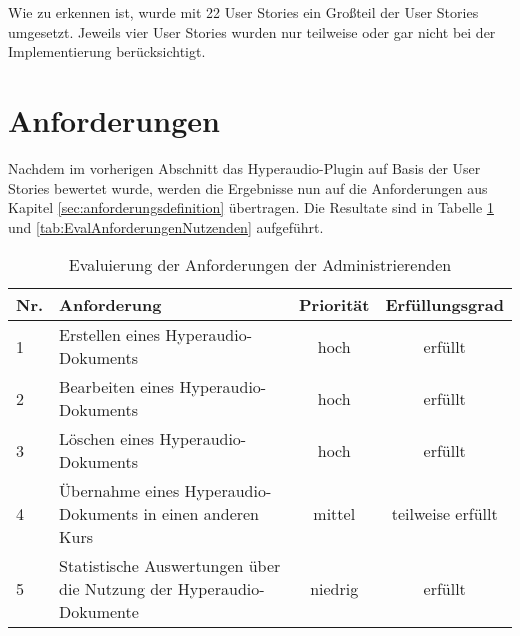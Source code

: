 Wie zu erkennen ist, wurde mit 22 User Stories ein Großteil der User Stories umgesetzt. Jeweils vier User Stories wurden nur teilweise oder gar nicht bei der Implementierung berücksichtigt.


\section{Anforderungen}
Nachdem im vorherigen Abschnitt das Hyperaudio-Plugin auf Basis der User Stories bewertet wurde, werden die Ergebnisse nun auf die Anforderungen aus Kapitel \ref{sec:anforderungsdefinition} übertragen. Die Resultate sind in Tabelle \ref{tab:EvalAnforderungenAdministrierenden} und \ref{tab:EvalAnforderungenNutzenden} aufgeführt.


\begin{table}[!ht]
\def\arraystretch{1.4}
\caption{Evaluierung der Anforderungen der Administrierenden}
\label{tab:EvalAnforderungenAdministrierenden}
 \begin{tabularx}{\textwidth}{lXcc}      
    \hline
    Nr. & Anforderung & Priorität & Erfüllungsgrad
    \\\hline
    1 & Erstellen eines Hyperaudio-Dokuments & hoch & erfüllt\\
    2 & Bearbeiten eines Hyperaudio-Dokuments & hoch & erfüllt\\
    3 & Löschen eines Hyperaudio-Dokuments & hoch & erfüllt\\
    4 & Übernahme eines Hyperaudio-Dokuments in einen anderen Kurs & mittel & teilweise erfüllt\\
    5 & Statistische Auswertungen über die Nutzung der Hyperaudio-Dokumente & niedrig & erfüllt\\
    \hline
    \end{tabularx}
\end{table}

